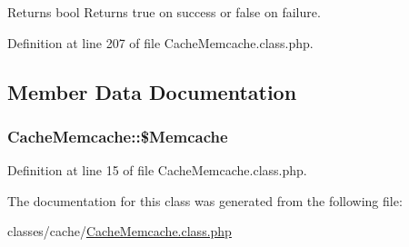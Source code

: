 \begin{DoxyReturn}{Returns}
bool Returns true on success or false on failure. 
\end{DoxyReturn}


Definition at line 207 of file Cache\+Memcache.\+class.\+php.



\subsection{Member Data Documentation}
\subsubsection[{\texorpdfstring{\$\+Memcache}{$Memcache}}]{\setlength{\rightskip}{0pt plus 5cm}Cache\+Memcache\+::\$\+Memcache}\hypertarget{classCacheMemcache_a56ac8c11dec3851aee654babe49d20f8}{}\label{classCacheMemcache_a56ac8c11dec3851aee654babe49d20f8}


Definition at line 15 of file Cache\+Memcache.\+class.\+php.



The documentation for this class was generated from the following file\+:\begin{DoxyCompactItemize}
\item 
classes/cache/\hyperlink{CacheMemcache_8class_8php}{Cache\+Memcache.\+class.\+php}\end{DoxyCompactItemize}
